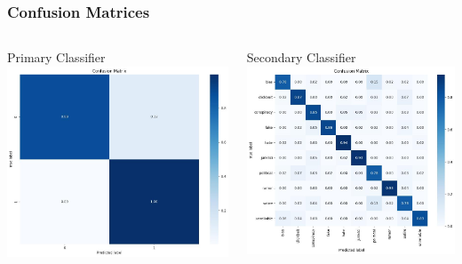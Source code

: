 \documentclass{beamer}
\begin{document}
\begin{frame}
    \frametitle{Confusion Matrices}
    
    \begin{columns}
        Primary Classifier
        \vspace{1cm}
        \includegraphics[width=\linewidth]{images/primary_confusion_matrix.jpeg}

        Secondary Classifier
        \vspace{1cm}
        \includegraphics[width=\linewidth]{images/secondary_confusion_matrix.jpeg}
    \end{columns}
    
    \vspace{0.3cm}
    
\end{frame}
\end{document}

